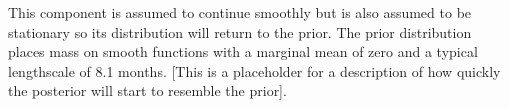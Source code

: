 This component is assumed to continue smoothly but is also assumed to be stationary so its distribution will return to the prior.
The prior distribution places mass on smooth functions with a marginal mean of zero and a typical lengthscale of 8.1 months.
[This is a placeholder for a description of how quickly the posterior will start to resemble the prior].